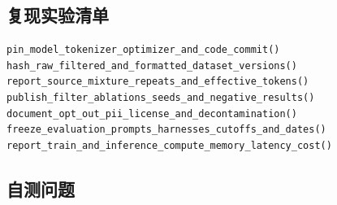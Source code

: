 \documentclass[a4paper]{article}
\begin{document}
\subsection{复现实验清单}

\begin{lstlisting}[caption={预训练项目的统一复现清单}]
pin_model_tokenizer_optimizer_and_code_commit()
hash_raw_filtered_and_formatted_dataset_versions()
report_source_mixture_repeats_and_effective_tokens()
publish_filter_ablations_seeds_and_negative_results()
document_opt_out_pii_license_and_decontamination()
freeze_evaluation_prompts_harnesses_cutoffs_and_dates()
report_train_and_inference_compute_memory_latency_cost()
\end{lstlisting}

\subsection{自测问题}
\end{document}

